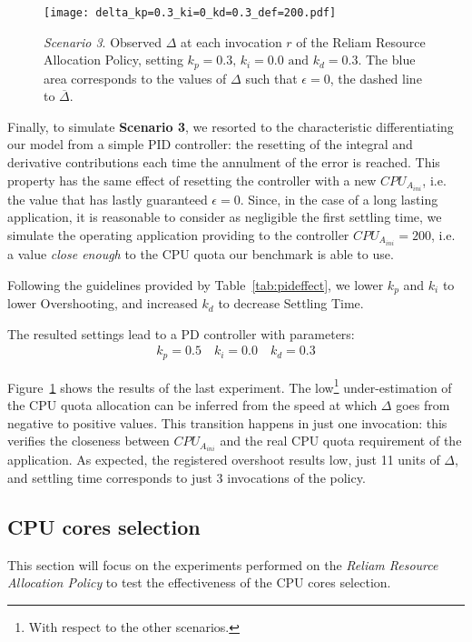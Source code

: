 \begin{figure}[t]
    \centering
    \texttt{[image: delta\_kp=0.3\_ki=0\_kd=0.3\_def=200.pdf]}
    \caption{\emph{Scenario 3}. Observed $\Delta$ at each invocation $r$ of the Reliam Resource Allocation Policy, setting $k_{p}=0.3\text{, }k_{i}=0.0\text{ and }k_{d}=0.3$. The blue area corresponds to the values of $\Delta$ such that $\epsilon=0$, the dashed line to $\overline{\Delta}$.}
    \label{fig:pid303}
\end{figure}

Finally, to simulate \textbf{Scenario 3}, we resorted to the characteristic differentiating our model from a simple PID controller: the resetting of the integral and derivative contributions each time the annulment of the error is reached. This property has the same effect of resetting the controller with a new $CPU_{A_{ini}}$, i.e. the value that has lastly guaranteed $\epsilon=0$. Since, in the case of a long lasting application, it is reasonable to consider as negligible the first settling time, we simulate the operating application providing to the controller $CPU_{A_{ini}}=200$, i.e. a value \emph{close enough} to the CPU quota our benchmark is able to use.

Following the guidelines provided by Table~\ref{tab:pideffect}, we lower $k_p$ and $k_i$ to lower Overshooting, and increased $k_d$ to decrease Settling Time.

The resulted settings lead to a PD controller with parameters:
\begin{align*}
    k_p = 0.5 \quad k_i = 0.0 \quad k_d = 0.3
\end{align*}

Figure~\ref{fig:pid303} shows the results of the last experiment. The low\footnote{With respect to the other scenarios.} under-estimation of the CPU quota allocation can be inferred from the speed at which $\Delta$ goes from negative to positive values. This transition happens in just one invocation: this verifies the closeness between $CPU_{A_{ini}}$ and the real CPU quota requirement of the application. As expected, the registered overshoot results low, just 11 units of $\Delta$, and settling time corresponds to just 3 invocations of the policy. 


\subsection{CPU cores selection}
This section will focus on the experiments performed on the \emph{Reliam Resource Allocation Policy} to test the effectiveness of the CPU cores selection.

